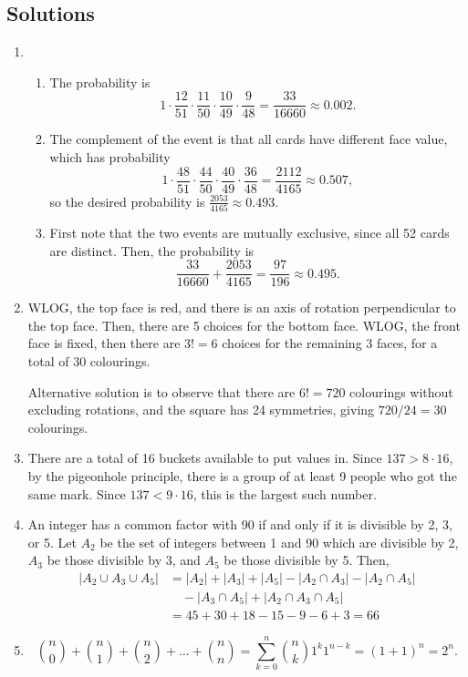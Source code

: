 \documentclass[a4paper,12pt]{article}
\begin{document}
\newpage

\subsection*{Solutions}

\begin{enumerate}
\item
    \begin{enumerate}
    \item
    The probability is
    \[ 1 \cdot \frac{12}{51} \cdot \frac{11}{50} \cdot \frac{10}{49}
       \cdot \frac{9}{48} = \frac{33}{16660} \approx 0.002. \]
    \item
    The complement of the event is that all cards have different face value,
    which has probability
    \[
    1 \cdot \frac{48}{51} \cdot \frac{44}{50} \cdot \frac{40}{49}
    \cdot \frac{36}{48} = \frac{2112}{4165} \approx 0.507,
    \]
    so the desired probability is $\frac{2053}{4165} \approx 0.493$.
    \item
    First note that the two events are mutually exclusive, since all 52 cards
    are distinct. Then, the probability is
    \[
        \frac{33}{16660} + \frac{2053}{4165} = \frac{97}{196} \approx 0.495.
    \]
    \end{enumerate}
\item
    WLOG, the top face is red, and there is an axis of rotation perpendicular
    to the top face. Then, there are 5 choices for the bottom face. WLOG, the
    front face is fixed, then there are $3!=6$ choices for the remaining 3
    faces, for a total of $30$ colourings.

    Alternative solution is to observe that there are $6!=720$ colourings
    without excluding rotations, and the square has 24 symmetries, giving
    $720 / 24 = 30$ colourings.
\item
    There are a total of 16 buckets available to put values in. Since
    $137 > 8 \cdot 16$, by the pigeonhole principle, there is a
    group of at least 9 people who got the same mark. Since $137 < 9 \cdot 16$,
    this is the largest such number.
\item
    An integer has a common factor with 90 if and only if it is divisible by
    2, 3, or 5. Let $A_2$ be the set of integers between 1 and 90 which are
    divisible by 2, $A_3$ be those divisible by 3, and $A_5$ be those divisible
    by 5. Then,
    \begin{align*}
        |A_2 \cup A_3 \cup A_5| &= |A_2| + |A_3| + |A_5| - |A_2 \cap A_3|
        - |A_2 \cap A_5| \\ & \quad - |A_3 \cap A_5| + |A_2 \cap A_3 \cap A_5| \\
        &= 45 + 30 + 18 - 15 - 9 - 6 + 3 = 66
    \end{align*}
\item
    \[
        {n \choose 0} + {n \choose 1} + {n \choose 2} + \dots + {n \choose n}
        = \sum_{k=0}^n {n \choose k} 1^k 1^{n-k} = (1+1)^n = 2^n.
    \]
\end{enumerate}
\end{document}
